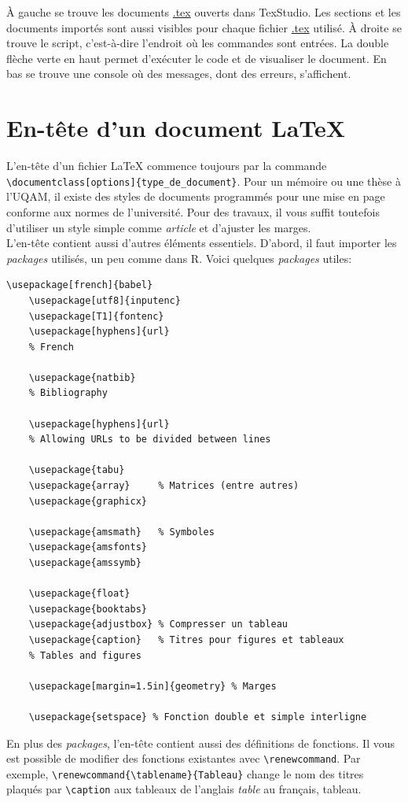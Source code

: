 \documentclass[12pt]{article}
\renewcommand{\tablename}{Tableau}
\renewcommand \tablename{Tableau} %
\begin{document}
	À gauche se trouve les documents \url{.tex} ouverts dans TexStudio. Les sections et les documents importés sont aussi visibles pour chaque fichier \url{.tex} utilisé. À droite se trouve le script, c'est-à-dire l'endroit où les commandes sont entrées. La double flèche verte en haut permet d'exécuter le code et de visualiser le document. En bas se trouve une console où des messages, dont des erreurs, s'affichent.
	
	\newpage
	\section{En-tête d'un document LaTeX}
	
	L'en-tête d'un fichier LaTeX commence toujours par la commande \\
	\lstinline|\documentclass[options]{type_de_document}|. Pour un mémoire ou une thèse à l'UQAM, il existe des styles de documents programmés pour une mise en page conforme aux normes de l'université. Pour des travaux, il vous suffit toutefois d'utiliser un style simple comme \textit{article} et d'ajuster les marges. \\
	
	L'en-tête contient aussi d'autres éléments essentiels. D'abord, il faut importer les \textit{packages} utilisés, un peu comme dans R. Voici quelques \textit{packages} utiles:
	
	\begin{lstlisting}[frame=single]
	\usepackage[french]{babel}
	\usepackage[utf8]{inputenc}
	\usepackage[T1]{fontenc}
	\usepackage[hyphens]{url}
	% French
	
	\usepackage{natbib}
	% Bibliography
	
	\usepackage[hyphens]{url}
	% Allowing URLs to be divided between lines
	
	\usepackage{tabu}
	\usepackage{array}     % Matrices (entre autres)
	\usepackage{graphicx}
	
	\usepackage{amsmath}   % Symboles
	\usepackage{amsfonts}
	\usepackage{amssymb}
	
	\usepackage{float}
	\usepackage{booktabs}
	\usepackage{adjustbox} % Compresser un tableau
	\usepackage{caption}   % Titres pour figures et tableaux
	% Tables and figures
	
	\usepackage[margin=1.5in]{geometry} % Marges
	
	\usepackage{setspace} % Fonction double et simple interligne
	\end{lstlisting}
	
	En plus des \textit{packages}, l'en-tête contient aussi des définitions de fonctions. Il vous est possible de modifier des fonctions existantes avec \lstinline|\renewcommand|. Par exemple, \lstinline|\renewcommand{\tablename}{Tableau}| change le nom des titres plaqués par \lstinline|\caption| aux tableaux de l'anglais \textit{table} au français, tableau. \\
	
\end{document}
